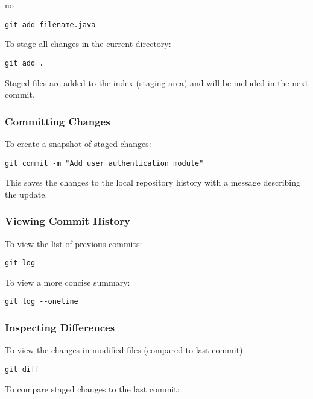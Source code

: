 no\documentclass{article}
\begin{document}
\begin{verbatim}
git add filename.java
\end{verbatim}

\noindent To stage all changes in the current directory:

\begin{verbatim}
git add .
\end{verbatim}

\noindent Staged files are added to the index (staging area) and will be included in the next commit.

\subsubsection{Committing Changes}

To create a snapshot of staged changes:

\begin{verbatim}
git commit -m "Add user authentication module"
\end{verbatim}

\noindent This saves the changes to the local repository history with a message describing the update.

\subsubsection{Viewing Commit History}

To view the list of previous commits:

\begin{verbatim}
git log
\end{verbatim}

\noindent To view a more concise summary:

\begin{verbatim}
git log --oneline
\end{verbatim}

\subsubsection{Inspecting Differences}

To view the changes in modified files (compared to last commit):

\begin{verbatim}
git diff
\end{verbatim}

\noindent To compare staged changes to the last commit:
\end{document}
